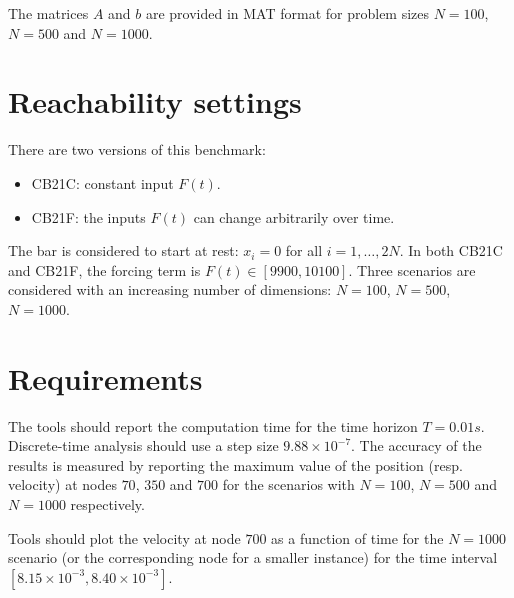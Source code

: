 \documentclass{article}
\begin{document}
The matrices $A$ and $b$ are provided in MAT format for problem sizes $N=100$, $N=500$ and $N=1000$.

\section{Reachability settings}

There are two versions of this benchmark:

\begin{itemize}
    \item CB21C: constant input $F(t)$.
 
     \item CB21F: the inputs $F(t)$ can change arbitrarily over time.
\end{itemize}

The bar is considered to start at rest: $x_i = 0$ for all $i = 1, \ldots, 2N$. In both CB21C and CB21F, the forcing term is $F(t) \in [9900, 10100]$. Three scenarios are considered with an increasing number of dimensions: $N = 100$, $N=500$, $N=1000$.

\section{Requirements}

The tools should report the computation time for the time horizon $T = 0.01s$. Discrete-time analysis should use a step size $9.88\times 10^{-7}$. The accuracy of the results is measured by reporting the maximum value of the position (resp. velocity) at nodes $70$, $350$ and $700$ for the scenarios with $N = 100$, $N=500$ and $N = 1000$ respectively.

Tools should plot the velocity at node $700$ as a function of time for the $N = 1000$ scenario (or the corresponding node for a smaller instance) for the time interval $[8.15\times 10^{-3}, 8.40\times 10^{-3}]$.






\end{document}
